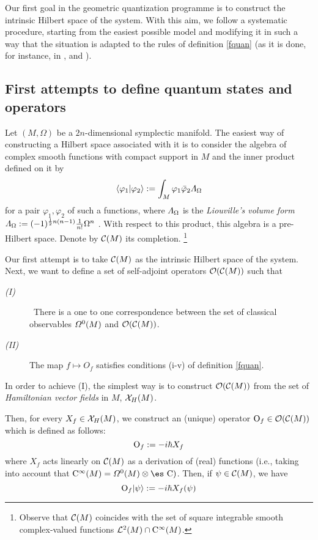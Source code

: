 \documentclass[12pt]{article}
\def\beq{\begin{equation}}
\def\eeq{\end{equation}}
\def\dst{\(}
\def\C{{\cal C}}
\def\sta{|\psi \rangle }
\def\Op{{\rm O}}
\def\Complex{\mbox{\es C}}
\def\Cinfty{{\rm C}^\infty}
\def\LF{{\mit\Lambda}_{\Omega}}
\begin{document}
Our first goal in the geometric quantization programme
is to construct the intrinsic Hilbert space of the system.
With this aim, we follow a systematic procedure,
starting from the easiest possible model and modifying it in such a way
that
the situation is adapted to the rules of definition
\ref{fquan} (as it is done, for instance,
in \cite{Ki-76}, \cite{SW-76} and \cite{Wo-80}).



\subsection{First attempts to define quantum states and operators}


Let $(M,\Omega )$
be a $2n$-dimensional symplectic manifold.
The easiest way of constructing
a Hilbert space associated with it is to consider the algebra
of complex smooth functions with compact support in $M$
and the inner product defined on it by
\beq
\langle \varphi_1 |\varphi_2\rangle  := \int_M \varphi_1 \bar \varphi_2
\LF
\label{inprod}
\eeq
for a pair $\varphi_1, \varphi_2$ of such a functions,
where $\LF$ is the {\it Liouville's volume form}
\dst \LF := (-1)^{\frac{1}{2}n(n-1)}\frac{1}{n!}\Omega^n\) .
With respect to this product, this algebra is a pre-Hilbert space.
Denote by $\C (M)$ its completion.%
\footnote{Observe that $\C (M)$ coincides with the set of
square integrable smooth complex-valued functions
${\cal L}^2(M) \cap \Cinfty (M)$.}

Our first attempt is to take $\C (M)$
as the intrinsic Hilbert space of the system.
Next, we want to define a set of self-adjoint operators ${\cal O}(\C
(M))$
such that
\begin{description}
\item[{\it (I)}] \
There is a one to one correspondence between the set of classical
observables
${\mit\Omega}^0(M)$ and ${\cal O}(\C (M))$.
\item[{\it (II)}]
The map $f \mapsto O_f$ satisfies conditions (i-v) of definition
\ref{fquan}.
\end{description}

In order to achieve (I), the simplest way is to construct ${\cal O}(\C
(M))$
from the set of {\it Hamiltonian vector fields} in $M$, ${\cal X}_H(M)$.

Then, for every $X_f \in {\cal X}_H(M)$, we construct an (unique)
operator
$\Op_f \in {\cal O}(\C (M))$ which is defined as follows:
$$
\Op_f := -i\hbar X_f
$$
where $X_f$ acts linearly on $\C (M)$ as a derivation of (real)
functions
 (i.e., taking into account that
 $\Cinfty (M) = {\mit\Omega}^0(M) \otimes\Complex)$.
Then, if $\psi \in \C (M)$, we have
$$
\Op_f\sta := -i\hbar X_f(\psi)
$$
\end{document}

